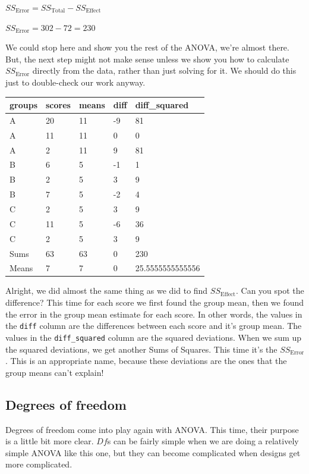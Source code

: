 \documentclass[
]{book}
\begin{document}
\(SS_\text{Error} = SS_\text{Total} - SS_\text{Effect}\)

\(SS_\text{Error} = 302 - 72 = 230\)

We could stop here and show you the rest of the ANOVA, we're almost there. But, the next step might not make sense unless we show you how to calculate \(SS_\text{Error}\) directly from the data, rather than just solving for it. We should do this just to double-check our work anyway.

\begin{tabular}{l|l|l|l|l}
\hline
groups & scores & means & diff & diff\_squared\\
\hline
A & 20 & 11 & -9 & 81\\
\hline
A & 11 & 11 & 0 & 0\\
\hline
A & 2 & 11 & 9 & 81\\
\hline
B & 6 & 5 & -1 & 1\\
\hline
B & 2 & 5 & 3 & 9\\
\hline
B & 7 & 5 & -2 & 4\\
\hline
C & 2 & 5 & 3 & 9\\
\hline
C & 11 & 5 & -6 & 36\\
\hline
C & 2 & 5 & 3 & 9\\
\hline
Sums & 63 & 63 & 0 & 230\\
\hline
Means & 7 & 7 & 0 & 25.5555555555556\\
\hline
\end{tabular}

Alright, we did almost the same thing as we did to find \(SS_\text{Effect}\). Can you spot the difference? This time for each score we first found the group mean, then we found the error in the group mean estimate for each score. In other words, the values in the \texttt{diff} column are the differences between each score and it's group mean. The values in the \texttt{diff\_squared} column are the squared deviations. When we sum up the squared deviations, we get another Sums of Squares. This time it's the \(SS_\text{Error}\). This is an appropriate name, because these deviations are the ones that the group means can't explain!

\subsection{Degrees of freedom}\label{degrees-of-freedom-1}

Degrees of freedom come into play again with ANOVA. This time, their purpose is a little bit more clear. \(Df\)s can be fairly simple when we are doing a relatively simple ANOVA like this one, but they can become complicated when designs get more complicated.
\end{document}
